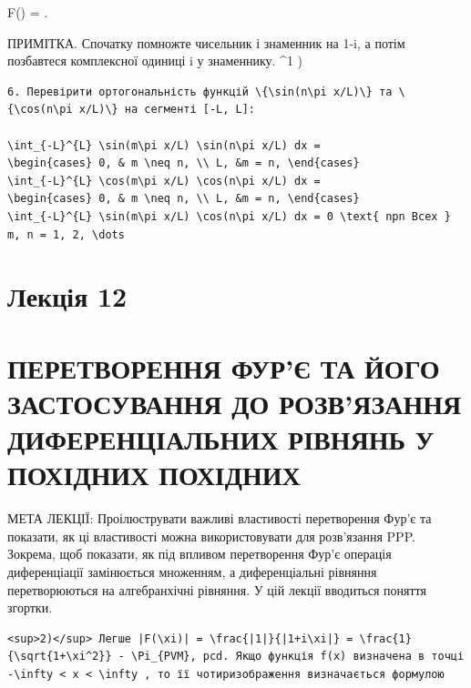 \documentclass[
  ukrainian,
]{article}
\begin{document}
\textbar F(\xi)\textbar{} = .

ПРИМІТКА. Спочатку помножте чисельник і знаменник на 1-i\xi , а потім
позбавтеся комплексної одиниці i у знаменнику. \^{}1 )

\begin{verbatim}
6. Перевірити ортогональність функцій \{\sin(n\pi x/L)\} та \{\cos(n\pi x/L)\} на сегменті [-L, L]:

\int_{-L}^{L} \sin(m\pi x/L) \sin(n\pi x/L) dx =
\begin{cases} 0, & m \neq n, \\ L, &m = n, \end{cases}
\int_{-L}^{L} \cos(m\pi x/L) \cos(n\pi x/L) dx =
\begin{cases} 0, & m \neq n, \\ L, &m = n, \end{cases}
\int_{-L}^{L} \sin(m\pi x/L) \cos(n\pi x/L) dx = 0 \text{ npn Bcex } m, n = 1, 2, \dots
\end{verbatim}

\section{Лекція 12}\label{ux43bux435ux43aux446ux456ux44f-12}

\section{ПЕРЕТВОРЕННЯ ФУР'Є ТА ЙОГО ЗАСТОСУВАННЯ ДО РОЗВ'ЯЗАННЯ
ДИФЕРЕНЦІАЛЬНИХ РІВНЯНЬ У ПОХІДНИХ
ПОХІДНИХ}\label{ux43fux435ux440ux435ux442ux432ux43eux440ux435ux43dux43dux44f-ux444ux443ux440ux454-ux442ux430-ux439ux43eux433ux43e-ux437ux430ux441ux442ux43eux441ux443ux432ux430ux43dux43dux44f-ux434ux43e-ux440ux43eux437ux432ux44fux437ux430ux43dux43dux44f-ux434ux438ux444ux435ux440ux435ux43dux446ux456ux430ux43bux44cux43dux438ux445-ux440ux456ux432ux43dux44fux43dux44c-ux443-ux43fux43eux445ux456ux434ux43dux438ux445-ux43fux43eux445ux456ux434ux43dux438ux445}

МЕТА ЛЕКЦІЇ: Проілюструвати важливі властивості перетворення Фур'є та
показати, як ці властивості можна використовувати для розв'язання PPP.
Зокрема, щоб показати, як під впливом перетворення Фур'є операція
диференціації замінюється множенням, а диференціальні рівняння
перетворюються на алгебранхічні рівняння. У цій лекції вводиться поняття
згортки.

\begin{verbatim}
<sup>2)</sup> Легше |F(\xi)| = \frac{|1|}{|1+i\xi|} = \frac{1}{\sqrt{1+\xi^2}} - \Pi_{PVM}, pcd. Якщо функція f(x) визначена в точці -\infty < x < \infty , то її чотиризображення визначається формулою
\end{verbatim}
\end{document}
